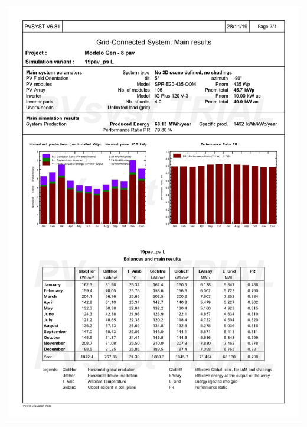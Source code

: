 \begin{table}[H]
    \centering
    \begin{tabular}{l}
        \includegraphics[width=\textwidth]{figures/attachments/resultpv30.jpg}
    \end{tabular}
\end{table}
\pagebreak
